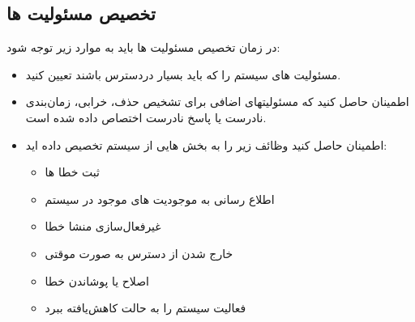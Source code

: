 \subsection{تخصیص مسئولیت ها} 
در زمان تخصیص مسئولیت ها باید  به موارد زیر توجه شود:
\begin{itemize}
\item
مسئولیت های سیستم را که باید بسیار در‌دسترس باشند تعیین کنید.
\item
اطمینان حاصل کنید که مسئولیتهای اضافی برای تشخیص حذف، خرابی، زمان‌بندی نادرست یا پاسخ نادرست اختصاص داده شده است.
\item
اطمینان حاصل کنید وظائف زیر را به بخش هایی از سیستم تخصیص داده اید:
\begin{itemize}
\item
ثبت خطا ها
\item
اطلاع رسانی به موجودیت های موجود در سیستم
\item
غیر‌فعال‌سازی منشا خطا
\item
خارج شدن از دسترس به صورت موقتی
\item
اصلاح یا پوشاندن خطا
\item
فعالیت سیستم را به حالت کاهش‌یافته  ببرد
\end{itemize}

\end{itemize}
